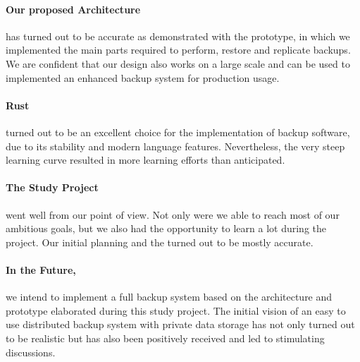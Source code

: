 \paragraph{Our proposed Architecture}
has turned out to be accurate as demonstrated with the prototype, in which we implemented the main parts required to perform, restore and replicate backups. We are confident that our design also works on a large scale and can be used to implemented an enhanced backup system for production usage.

\paragraph{Rust}
turned out to be an excellent choice for the implementation of backup software, due to its stability and modern language features.
Nevertheless, the very steep learning curve resulted in more learning efforts than anticipated.

\paragraph{The Study Project}
went well from our point of view. Not only were we able to reach most of our ambitious goals, but we also had the opportunity to learn a lot during the project. Our initial planning and the  turned out to be mostly accurate.

\paragraph{In the Future,}
we intend to implement a full backup system based on the architecture and prototype elaborated during this study project. The initial vision of an easy to use distributed backup system with private data storage has not only turned out to be realistic but has also been positively received and led to stimulating discussions.